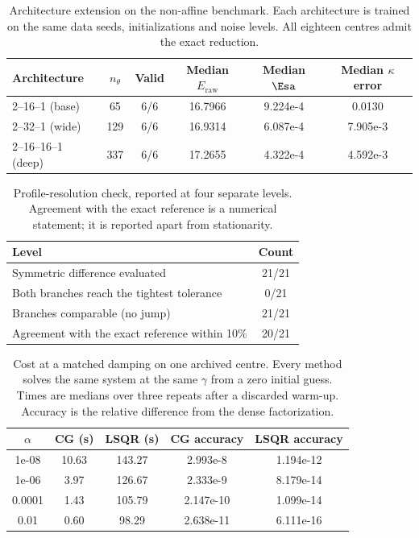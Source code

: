 \begin{table}[!htbp]
\centering
\caption{Architecture extension on the non-affine benchmark.
Each architecture is trained on the same data seeds, initializations and noise levels.
All eighteen centres admit the exact reduction.}
\label{tab:e6_architecture}
\footnotesize
\setlength{\tabcolsep}{4pt}
\begin{tabular}{lccccc}
\toprule
Architecture & $n_\theta$ & Valid & Median $E_{\mathrm{raw}}$ & Median $\Esa$ & Median $\kappa$ error \\
\midrule
2--16--1 (base) & 65 & 6/6 & 16.7966 & 9.224e-4 & 0.0130 \\
2--32--1 (wide) & 129 & 6/6 & 16.9314 & 6.087e-4 & 7.905e-3 \\
2--16--16--1 (deep) & 337 & 6/6 & 17.2655 & 4.322e-4 & 4.592e-3 \\
\bottomrule
\end{tabular}
\end{table}
\begin{table}[!htbp]
\centering
\caption{Profile-resolution check, reported at four separate levels.
Agreement with the exact reference is a numerical statement; it is reported apart from stationarity.}
\label{tab:e7_scope}
\footnotesize
\setlength{\tabcolsep}{4pt}
\begin{tabular}{lc}
\toprule
Level & Count \\
\midrule
Symmetric difference evaluated & 21/21 \\
Both branches reach the tightest tolerance & 0/21 \\
Branches comparable (no jump) & 21/21 \\
Agreement with the exact reference within 10\% & 20/21 \\
\bottomrule
\end{tabular}
\end{table}
\begin{table}[!htbp]
\centering
\caption{Cost at a matched damping on one archived centre.
Every method solves the same system at the same $\gamma$ from a zero initial guess.
Times are medians over three repeats after a discarded warm-up.
Accuracy is the relative difference from the dense factorization.}
\label{tab:e8_cost}
\footnotesize
\setlength{\tabcolsep}{4pt}
\begin{tabular}{ccccc}
\toprule
$\alpha$ & CG (s) & LSQR (s) & CG accuracy & LSQR accuracy \\
\midrule
1e-08 & 10.63 & 143.27 & 2.993e-8 & 1.194e-12 \\
1e-06 & 3.97 & 126.67 & 2.333e-9 & 8.179e-14 \\
0.0001 & 1.43 & 105.79 & 2.147e-10 & 1.099e-14 \\
0.01 & 0.60 & 98.29 & 2.638e-11 & 6.111e-16 \\
\bottomrule
\end{tabular}
\end{table}
